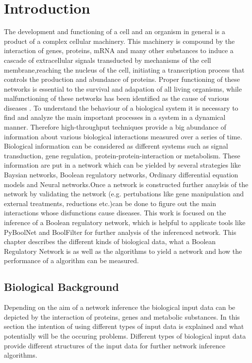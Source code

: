 \chapter{Introduction}

The development and functioning of a cell and an organism in general is a product of a complex cellular machinery. This machinery is compound by the interaction of genes, proteins, mRNA and many other substances to induce a cascade of extracellular signals transducted by mechanisms of the cell membrane,reaching the nucleus of the cell, initiating a transcription process that controls the production and abundance of proteins. Proper functioning of these networks is essential to the survival and adapation of all living organisms, while malfunctioning of these networks has been identified as the cause of various diseases \citep{An evaluation of methods for inferring boolean network from time-series data}.
To understand the behaviour of a biological system it is necessary to find and analyze the main important processes in a system in a dynamical manner. Therefore high-throughput techniques provide a big abundance of information about various biological interactions measured over a series of time. Biological information can be considered as different systems such as signal transduction, gene regulation, protein-protein-interaction or metabolism. These information are put in a network which can be yielded by several strategies like Baysian networks, Boolean regulatory networks, Ordinary differential equation models and Neural networks\citep{SAADATPOUR20133}.Once a network is constructed further anaylsis of the network by validating the network (e.g. pertubations like gene manipulation and external treatments, reductions etc.)can be done to figure out the main interactions whose disfunctions cause diseases.
This work is focused on the inference of a Boolean regulatory network, which is helpful to applicate tools like PyBoolNet and BoolFilter for further analysis of the inferenced network. This chapter describes the different kinds of biological data, what a Boolean Regulatory Network is as well as the algorithms to yield a network and how the performance of a algorithm can be measured.


\section{Biological Background}

Depending on the aim of a network inference the biological input data can be depicted by the interaction of proteins, genes and metabolic substances. In this section the intention of using different types of input data is explained and what potentially will be the occuring problems. Different types of biological input data provide different structures of the input data for further network inference algorithms. 
\newpage

